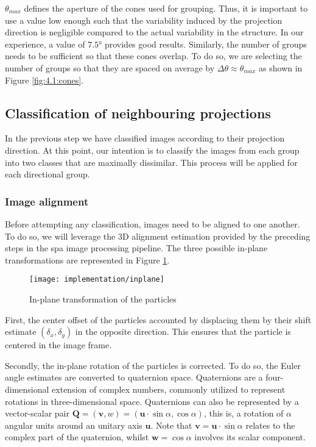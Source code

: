 \documentclass[../main.tex]{subfiles}
\begin{document}
$\theta_{max}$ defines the aperture of the cones used for grouping. Thus, it is important to use a value low enough such that the variability induced by the projection direction is negligible compared to the actual variability in the structure. In our experience, a value of $7.5 \si{\degree}$ provides good results. Similarly, the number of groups needs to be sufficient so that these cones overlap. To do so, we are selecting the number of groups so that they are spaced on average by $\Delta\theta \approx \theta_{max}$ as shown in Figure \ref{fig:4.1:cones}. 

\subsection{Classification of neighbouring projections}
In the previous step we have classified images according to their projection direction.  At this point, our intention is to classify the images from each group into two classes that are maximally dissimilar. This process will be applied for each directional group.

\subsubsection{Image alignment}
Before attempting any classification, images need to be aligned to one another. To do so, we will leverage the 3D alignment estimation provided by the preceding steps in the \gls{spa} image processing pipeline. The three possible in-plane transformations are represented in Figure \ref{fig:4.1:inplane}.

\begin{figure}[hbp]
    \centering
    \texttt{[image: implementation/inplane]}
    \caption{In-plane transformation of the particles}
    \label{fig:4.1:inplane}
\end{figure}

First, the center offset of the particles accounted by displacing them by their shift estimate $(\delta_x, \delta_y)$ in the opposite direction. This ensures that the particle is centered in the image frame. 

Secondly, the in-plane rotation of the particles is corrected. To do so, the Euler angle estimates are converted to quaternion space. Quaternions are a four-dimensional extension of complex numbers, commonly utilized to represent rotations in three-dimensional space. Quaternions can also be represented by a vector-scalar pair $\bm{Q} = (\bm{v}, w) = (\bm{u} \cdot \sin\alpha, \cos\alpha)$, this is, a rotation of $\alpha$ angular units around an unitary axis $\bm{u}$. Note that $\bm {v} = \bm{u} \cdot \sin\alpha$ relates to the complex part of the quaternion, whilst $\bm {w} = \cos\alpha$ involves its scalar component. 
\end{document}

